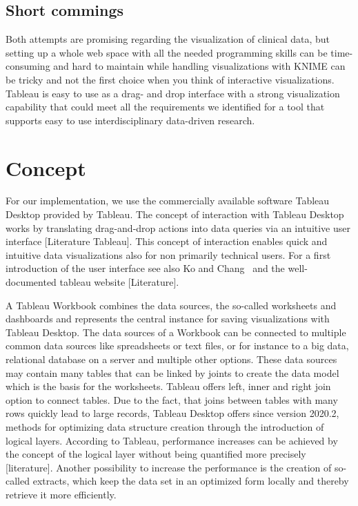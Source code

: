 \documentclass[aac]{iosart2x}
\begin{document}
\subsection{Short commings}
Both attempts are promising regarding the visualization of clinical data, but setting up a whole web space with all the needed programming skills can be time-consuming and hard to maintain while handling visualizations with KNIME can be tricky and not the first choice when you think of interactive visualizations. Tableau is easy to use as a drag- and drop interface with a strong visualization capability that could meet all the requirements we identified for a tool that supports easy to use interdisciplinary data-driven research.
 
\section{Concept}\label{s3}
%
For our implementation, we use the commercially available software Tableau Desktop provided by Tableau\textregistered. The concept of interaction with Tableau Desktop works by translating drag-and-drop actions into data queries via an intuitive user interface [Literature Tableau]. This concept of interaction enables quick and intuitive data visualizations also for non primarily technical users. For a first introduction of the user interface see also Ko and Chang~\cite{Ko.2017} and the well-documented tableau website [Literature].

A Tableau Workbook combines the data sources, the so-called worksheets and dashboards and represents the central instance for saving visualizations with Tableau Desktop. The data sources of a Workbook can be connected to multiple common data sources like spreadsheets or text files, or for instance to a big data, relational database on a server and multiple other options. These data sources may contain many tables that can be linked by joints to create the data model which is the basis for the worksheets. Tableau offers left, inner and right join option to connect tables. Due to the fact, that joins between tables with many rows quickly lead to large records, Tableau Desktop offers since version 2020.2, methods for optimizing data structure creation through the introduction of logical layers. According to Tableau, performance increases can be achieved by the concept of the logical layer without being quantified more precisely [literature]. Another possibility to increase the performance is the creation of so-called extracts, which keep the data set in an optimized form locally and thereby retrieve it more efficiently.
\end{document}
